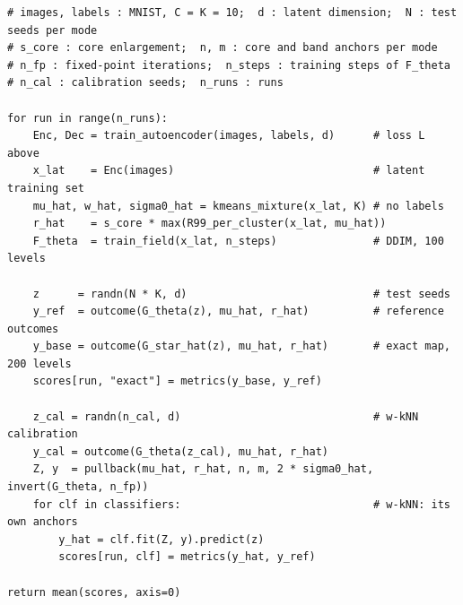 
\begin{algorithm}[htbp]
\caption{Evaluation protocol in the MNIST latent space, for one anchor budget $b$.}
\label{alg:app-mnist}
\begin{lstlisting}[style=appcode]
# images, labels : MNIST, C = K = 10;  d : latent dimension;  N : test seeds per mode
# s_core : core enlargement;  n, m : core and band anchors per mode
# n_fp : fixed-point iterations;  n_steps : training steps of F_theta
# n_cal : calibration seeds;  n_runs : runs

for run in range(n_runs):
    Enc, Dec = train_autoencoder(images, labels, d)      # loss L above
    x_lat    = Enc(images)                               # latent training set
    mu_hat, w_hat, sigma0_hat = kmeans_mixture(x_lat, K) # no labels
    r_hat    = s_core * max(R99_per_cluster(x_lat, mu_hat))
    F_theta  = train_field(x_lat, n_steps)               # DDIM, 100 levels

    z      = randn(N * K, d)                             # test seeds
    y_ref  = outcome(G_theta(z), mu_hat, r_hat)          # reference outcomes
    y_base = outcome(G_star_hat(z), mu_hat, r_hat)       # exact map, 200 levels
    scores[run, "exact"] = metrics(y_base, y_ref)

    z_cal = randn(n_cal, d)                              # w-kNN calibration
    y_cal = outcome(G_theta(z_cal), mu_hat, r_hat)
    Z, y  = pullback(mu_hat, r_hat, n, m, 2 * sigma0_hat, invert(G_theta, n_fp))
    for clf in classifiers:                              # w-kNN: its own anchors
        y_hat = clf.fit(Z, y).predict(z)
        scores[run, clf] = metrics(y_hat, y_ref)

return mean(scores, axis=0)
\end{lstlisting}
\end{algorithm}

